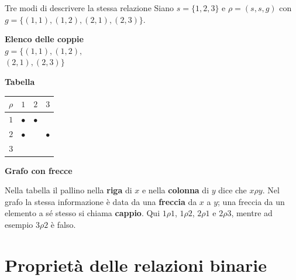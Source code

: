 \begin{esempio}{Tre modi di descrivere la stessa relazione}
    Siano $s = \{1, 2, 3\}$ e $\rho = (s, s, g)$ con $g = \{(1, 1), (1, 2), (2, 1), (2, 3)\}$.
    \begin{center}
    \begin{minipage}[c]{0.28\linewidth}\centering
        \textbf{Elenco delle coppie}\\[2mm]
        $g = \{(1,1), (1,2),$\\[0.5mm] $(2,1), (2,3)\}$
    \end{minipage}%
    \hfill
    \begin{minipage}[c]{0.28\linewidth}\centering
        \textbf{Tabella}\\[2mm]
        \renewcommand{\arraystretch}{1.25}
        \begin{tabular}{c|ccc}
            $\rho$ & $1$ & $2$ & $3$ \\ \hline
            $1$ & $\bullet$ & $\bullet$ & \\
            $2$ & $\bullet$ & & $\bullet$ \\
            $3$ & & & \\
        \end{tabular}
    \end{minipage}%
    \hfill
    \begin{minipage}[c]{0.38\linewidth}\centering
        \textbf{Grafo con frecce}\\[1mm]
    \end{minipage}
    \end{center}
    Nella tabella il pallino nella \textbf{riga} di $x$ e nella \textbf{colonna} di $y$ dice che $x \rho y$. Nel grafo la stessa
    informazione è data da una \textbf{freccia} da $x$ a $y$; una freccia da un elemento a sé stesso si chiama \textbf{cappio}.
    Qui $1 \rho 1$, $1 \rho 2$, $2 \rho 1$ e $2 \rho 3$, mentre ad esempio $3 \rho 2$ è falso.
\end{esempio}

\section{Proprietà delle relazioni binarie}\label{sec:proprieta-relazioni}

